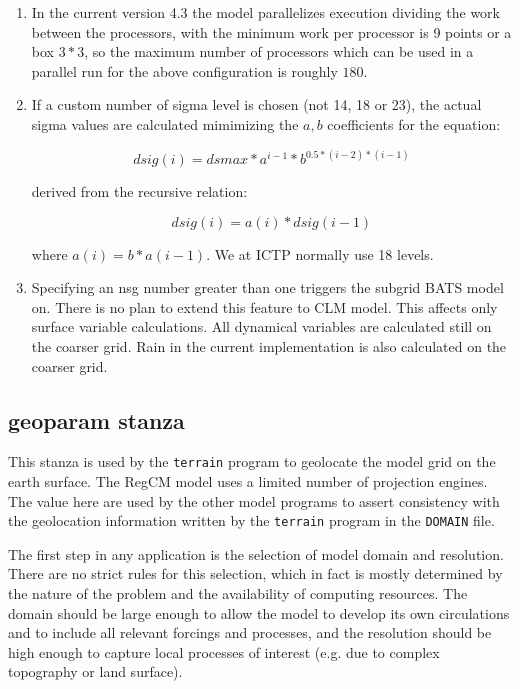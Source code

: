 \begin{enumerate}
\item In the current version 4.3 the model parallelizes execution dividing
the work between the processors, with the minimum work per processor is 9
points or a box $3*3$, so the maximum number of processors which can be used
in a parallel run for the above configuration is roughly $180$.
\item If a custom number of sigma level is chosen (not 14, 18 or 23), the actual
sigma values are calculated mimimizing the $a,b$ coefficients for the 
equation:

\begin{equation}
  dsig(i) = dsmax*a^{i-1}*b^{0.5*(i-2)*(i-1)}
\end{equation}

derived from the recursive relation:

\begin{equation}
  dsig(i) = a(i)*dsig(i-1)
\end{equation}

where $a(i) = b*a(i-1)$. We at ICTP normally use 18 levels.
\item Specifying an nsg number greater than one triggers the subgrid BATS model
on. There is no plan to extend this feature to CLM model. This affects only
surface variable calculations. All dynamical variables are calculated still
on the coarser grid. Rain in the current implementation is also calculated on
the coarser grid.
\end{enumerate}

\subsection{geoparam stanza}
\label{geoparam}

This stanza is used by the \verb=terrain= program to geolocate the model grid
on the earth surface. The RegCM model uses a limited number of projection
engines. The value here are used by the other model programs to assert
consistency with the geolocation information written by the \verb=terrain=
program in the \verb=DOMAIN= file.

The first step in any application is the selection of model domain and
resolution. There are no strict rules for this selection, which in fact is
mostly determined by the nature of the problem and the availability of
computing resources. The domain should be large enough to allow the model to
develop its own circulations and to include all relevant forcings and
processes, and the resolution should be high enough to capture local processes
of interest (e.g. due to complex topography or land surface).

